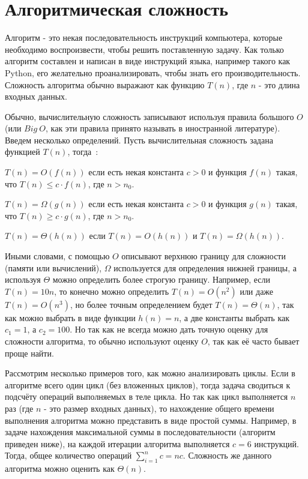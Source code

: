 \section{Алгоритмическая сложность}
\label{sec:complexity}

Алгоритм - это некая последовательность инструкций компьютера, которые необходимо воспроизвести, 
чтобы решить поставленную задачу. Как только алгоритм составлен и написан в виде инструкций языка,
например такого как Python, его желательно проанализировать, чтобы знать его производительность.
Сложность алгоритма обычно выражают как функцию $T(n)$, где $n$ - это длина входных данных. 

Обычно, вычислительную сложность записывают используя правила большого $O$ (или $Big\ O$, как эти правила 
принято называть в иностранной литературе). Введем несколько определений. Пусть вычислительная 
сложность задана функцией $T(n)$, тогда~\cite{weiss:dsaa}:

\begin{definition}
$T(n) = O(f(n))$ если есть некая константа $c > 0$ и функция $f(n)$ такая, что $T(n) \le c \cdot f(n)$, где $n>n_0$.
\end{definition}

\begin{definition}
$T(n) = \Omega(g(n))$ если есть некая константа $c > 0$ и функция $g(n)$ такая, что $T(n) \ge c \cdot g(n)$, где $n>n_0$.
\end{definition}

\begin{definition}
$T(n) = \Theta(h(n))$ если $T(n) = O(h(n))$ и $T(n) = \Omega(h(n))$.
\end{definition}

Иными словами, с помощью $O$ описывают верхнюю границу для сложности (памяти или вычислений), $\Omega$ используется для определения нижней границы, а используя $\Theta$ можно определить более строгую 
границу. Например, если $T(n) = 10n$, то конечно можно определить $T(n) = O(n^2)$ или даже $T(n) = O(n^3)$,
но более точным определением будет $T(n) = \Theta(n)$, так как можно выбрать в виде функции $h(n) = n$, а две константы выбрать как $c_1=1$, а $c_2=100$. Но так как не всегда можно дать точную оценку для 
сложности алгоритма, то обычно используют оценку $O$, так как её часто бывает проще найти.

Рассмотрим несколько примеров того, как можно анализировать циклы. Если в алгоритме 
всего один цикл (без вложенных циклов), тогда задача сводиться к подсчёту операций 
выполняемых в теле цикла. Но так как цикл выполняется $n$ раз (где $n$ - это размер входных 
данных), то нахождение общего времени выполнения алгоритма можно представить в виде простой суммы.
Например, в задаче нахождения максимальной суммы в последовательности (алгоритм приведен ниже),
на каждой итерации алгоритма выполняется $c=6$ инструкций. Тогда, общее количество операций 
$\sum_{i=1}^n c = nc$. Сложность же данного алгоритма можно оценить как $\Theta(n)$.

